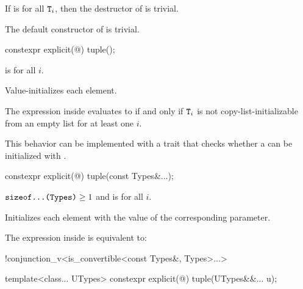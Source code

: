 \pnum
If  is  for all $\texttt{\protect T}_i$,
then the destructor of  is trivial.

\pnum
The default constructor of  is trivial.

%
\begin{itemdecl}
constexpr explicit(@\seebelow@) tuple();
\end{itemdecl}

\begin{itemdescr}
\pnum
\constraints
{} is  for all $i$.

\pnum
\effects
Value-initializes each element.

\pnum
\remarks
The expression inside  evaluates to 
if and only if $\texttt{\protect T}_i$ is not
copy-list-initializable from an empty list
for at least one $i$.
\begin{note}
This behavior can be implemented with a trait that checks whether
a  can be initialized with \tcode{\{\}}.
\end{note}
\end{itemdescr}

%
\begin{itemdecl}
constexpr explicit(@\seebelow@) tuple(const Types&...);
\end{itemdecl}

\begin{itemdescr}
\pnum
\constraints
$\texttt{\protect sizeof...(Types)} \geq 1$ and
 is  for all $i$.

\pnum
\effects
Initializes each element with the value of the
corresponding parameter.

\pnum
\remarks
The expression inside  is equivalent to:
\begin{codeblock}
!conjunction_v<is_convertible<const Types&, Types>...>
\end{codeblock}
\end{itemdescr}

%
\begin{itemdecl}
template<class... UTypes> constexpr explicit(@\seebelow@) tuple(UTypes&&... u);
\end{itemdecl}

